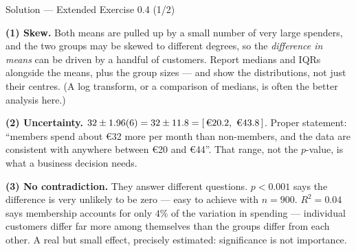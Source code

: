 \documentclass[aspectratio=169,11pt]{beamer}
\begin{document}
\begin{frame}{Solution --- Extended Exercise 0.4 (1/2)}
  \begin{solutionbox}
    \scriptsize
    \textbf{(1) Skew.} Both means are pulled up by a small number of very
    large spenders, and the two groups may be skewed to different degrees, so
    the \emph{difference in means} can be driven by a handful of customers.
    Report medians and IQRs alongside the means, plus the group sizes --- and
    show the distributions, not just their centres. (A log transform, or a
    comparison of medians, is often the better analysis here.)

    \textbf{(2) Uncertainty.} $32 \pm 1.96(6) = 32 \pm 11.8 =
    [\,\text{\euro}20.2,\ \text{\euro}43.8\,]$. Proper statement: ``members
    spend about \euro 32 more per month than non-members, and the data are
    consistent with anywhere between \euro 20 and \euro 44''. That range, not
    the $p$-value, is what a business decision needs.

    \textbf{(3) No contradiction.} They answer different questions.
    $p < 0.001$ says the difference is very unlikely to be zero --- easy to
    achieve with $n = 900$. $R^2 = 0.04$ says membership accounts for only
    $4\%$ of the variation in spending --- individual customers differ far
    more among themselves than the groups differ from each other. A real but
    small effect, precisely estimated: significance is not importance.
  \end{solutionbox}
\end{frame}
\end{document}
